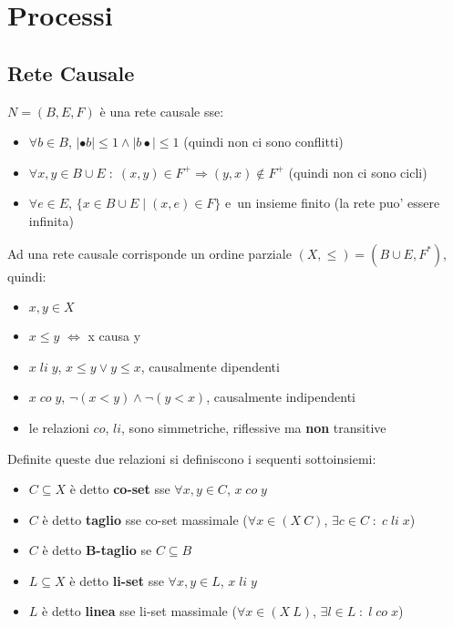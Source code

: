 \chapter{Processi}

\section{Rete Causale}

$N = (B, E, F)$ \`e una rete causale sse:
\begin{itemize}
    \item $\forall b \in B$, $|\bullet b| \leq 1 \land |b \bullet| \leq 1$ (quindi non ci sono conflitti)
    \item $\forall x,y \in B \cup E \; : \; (x, y) \in F^+ \Rightarrow (y, x) \notin F^+$ (quindi non ci sono cicli)
    \item $\forall e \in E$, $\{ x \in B \cup E \; | \; (x, e) \in F \}$ e\ un insieme finito (la rete puo' essere infinita)
\end{itemize}

Ad una rete causale corrisponde un ordine parziale $(X, \leq) = (B \cup E, F^*)$, quindi:

\begin{itemize}
    \item $x,y \in X$
    \item $x \leq y$ $\Leftrightarrow$ x causa y
    \item $x \; li \; y$, $x \leq y \lor y \leq x$, causalmente dipendenti
    \item $x \; co \; y$, $\neg (x < y) \land \neg (y < x)$, causalmente indipendenti
    \item le relazioni $co$, $li$, sono simmetriche, riflessive ma \textbf{non} transitive
\end{itemize}

Definite queste due relazioni si definiscono i sequenti sottoinsiemi:

\begin{itemize}
    \item $C \subseteq X$ \`e detto \textbf{co-set} sse $\forall x,y \in C$, $x \; co \; y$
    \item $C$ \`e detto \textbf{taglio} sse co-set massimale ($\forall x \in (X \ C)$, $\exists c \in C \; : \; c \; li \; x$)
    \item $C$ \`e detto \textbf{B-taglio} se $C \subseteq B$
    \item $L \subseteq X$ \`e detto \textbf{li-set} sse $\forall x,y \in L$, $x \; li \; y$
    \item $L$ \`e detto \textbf{linea} sse li-set massimale ($\forall x \in (X \ L)$, $\exists l \in L \; : \; l \; co \; x$)
\end{itemize}

